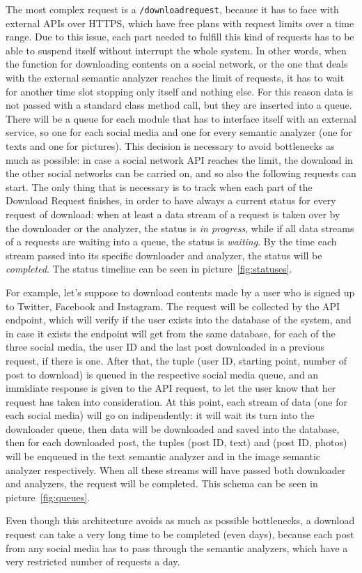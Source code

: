 The most complex request is a \texttt{/downloadrequest}, because it has to face with external APIs over HTTPS, which have free plans with request limits over a time range. Due to this issue, each part needed to fulfill this kind of requests has to be able to suspend itself without interrupt the whole system. In other words, when the function for downloading contents on a social network, or the one that deals with the external semantic analyzer reaches the limit of requests, it has to wait for another time slot stopping only itself and nothing else. For this reason data is not passed with a standard class method call, but they are inserted into a queue. There will be a queue for each module that has to interface itself with an external service, so one for each social media and one for every semantic analyzer (one for texts and one for pictures). This decision is necessary to avoid bottlenecks as much as possible: in case a social network API reaches the limit, the download in the other social networks can be carried on, and so also the following requests can start. The only thing that is necessary is to track when each part of the Download Request finishes, in order to have always a current status for every request of download: when at least a data stream of a request is taken over by the downloader or the analyzer, the status is \textit{in progress}, while if all data streams of a requests are waiting into a queue, the status is \textit{waiting}. By the time each stream passed into its specific downloader and analyzer, the status will be \textit{completed}. The status timeline can be seen in picture~\ref{fig:statuses}.

For example, let's suppose to download contents made by a user who is signed up to Twitter, Facebook and Instagram. The request will be collected by the API endpoint, which will verify if the user exists into the database of the system, and in case it exists the endpoint will get from the same database, for each of the three social media, the user ID and the last post downloaded in a previous request, if there is one. After that, the tuple (user ID, starting point, number of post to download) is queued in the respective social media queue, and an immidiate response is given to the API request, to let the user know that her request has taken into consideration. At this point, each stream of data (one for each social media) will go on indipendently: it will wait its turn into the downloader queue, then data will be downloaded and saved into the database, then for each downloaded post, the tuples (post ID, text) and (post ID, photos) will be enqueued in the text semantic analyzer and in the image semantic analyzer respectively. When all these streams will have passed both downloader and analyzers, the request will be completed. This schema can be seen in picture~\ref{fig:queues}.

Even though this architecture avoids as much as possible bottlenecks, a download request can take a very long time to be completed (even days), because each post from any social media has to pass through the semantic analyzers, which have a very restricted number of requests a day.

